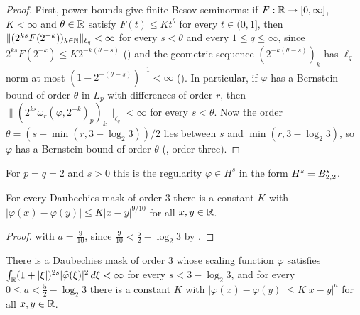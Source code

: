 \begin{proof}
\leanok
{}
First, power bounds give finite Besov seminorms: if $F : \mathbb{R} \to [0, \infty]$, $K < \infty$ and
$\theta \in \mathbb{R}$ satisfy $F(t) \leq K t^\theta$ for every $t \in (0, 1]$, then
$\|(2^{ks} F(2^{-k}))_{k \in \mathbb{N}}\|_{\ell_q} < \infty$ for every $s < \theta$ and every
$1 \leq q \leq \infty$, since $2^{ks} F(2^{-k}) \leq K 2^{-k(\theta - s)}$
() and the geometric sequence $(2^{-k(\theta - s)})_k$ has $\ell_q$
norm at most $(1 - 2^{-(\theta - s)})^{-1} < \infty$ (). In particular, if
$\varphi$ has a Bernstein bound of order $\theta$ in $L_p$ with differences of order $r$, then
$\|(2^{ks} \omega_r(\varphi, 2^{-k})_p)_k\|_{\ell_q} < \infty$ for every $s < \theta$. Now the
order $\theta = (s + \min(r, 3 - \log_2 3))/2$ lies between $s$ and $\min(r, 3 - \log_2 3)$, so
$\varphi$ has a Bernstein bound of order $\theta$ (, order
three).
\end{proof}

For $p = q = 2$ and $s > 0$ this is the regularity $\varphi \in H^s$ in the form
$H^s = B^{s}_{2,2}$.

\begin{corollary}
\label{cor:daub-holder-nine-tenths}
\leanok
{}
For every Daubechies mask of order $3$ there is a constant $K$ with
$|\varphi(x) - \varphi(y)| \leq K |x - y|^{9/10}$ for all $x, y \in \mathbb{R}$.
\end{corollary}

\begin{proof}
\leanok
{}
 with $a = \frac{9}{10}$, since
$\frac{9}{10} < \frac52 - \log_2 3$ by .
\end{proof}

\begin{corollary}
\label{cor:daub-order-three-regular}
\leanok
{}
There is a Daubechies mask of order $3$ whose scaling function $\varphi$ satisfies
$\int_{\mathbb{R}} (1 + |\xi|)^{2s} |\widehat\varphi(\xi)|^2 \, d\xi < \infty$ for every
$s < 3 - \log_2 3$, and for every $0 \leq a < \frac52 - \log_2 3$ there is a constant $K$ with
$|\varphi(x) - \varphi(y)| \leq K |x - y|^a$ for all $x, y \in \mathbb{R}$.
\end{corollary}

